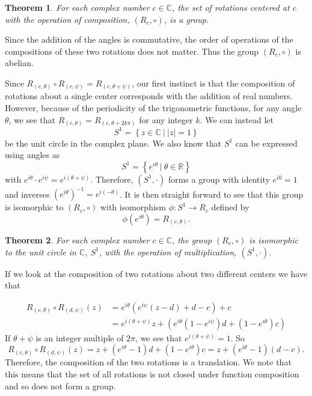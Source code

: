 \documentclass[
]{book}
\newtheorem{theorem}{Theorem}[chapter]
\theoremstyle{definition}
\theoremstyle{definition}
\theoremstyle{definition}
\theoremstyle{definition}
\theoremstyle{remark}
\begin{document}
\begin{theorem}
For each complex number \(c\in \mathbb{C}\), the set of rotations centered at \(c\) with the operation of composition, \((R_c,\circ)\), is a group.
\end{theorem}

Since the addition of the angles is commutative, the order of operations of the compositions of these two rotations does not matter. Thus the group \((R_c,\circ)\) is abelian.

Since \(R_{(c,\theta)} \circ R_{(c,\psi)} = R_{(c, \theta+\psi)}\), our first instinct is that the composition of rotations about a single center corresponds with the addition of real numbers. However, because of the periodicity of the trigonometric functions, for any angle \(\theta\), we see that \(R_{(c,\theta)} = R_{(c,\theta+2k\pi)}\) for any integer \(k\). We can instead let \[S^1= \left\{ z\in \mathbb{C} \: \vert \: |z|=1\right\}\] be the unit circle in the complex plane. We also know that \(S^1\) can be expressed using angles as \[S^1=\left\{ e^{i\theta} \: \vert \: \theta\in \mathbb{R}\right\}\] with \(e^{i\theta} \cdot e^{i\psi} = e^{i (\theta+\psi)}\). Therefore, \((S^1,\cdot)\) forms a group with identity \(e^{i0}=1\) and inverses \(\left(e^{i\theta}\right)^{-1} = e^{i (-\theta)}\). It is then straight forward to see that this group is isomorphic to \((R_c,\circ)\) with isomorphism
\(\phi:S^1\rightarrow R_c\) defined by \[\phi \left(e^{i\theta} \right) = R_{(c,\theta)}.\]

\begin{theorem}
For each complex number \(c\in \mathbb{C}\), the group \((R_c,\circ)\) is isomorphic to the unit circle in \(\mathbb{C}\), \(S^1\), with the operation of multiplication, \((S^1,\cdot)\).
\end{theorem}

If we look at the composition of two rotations about two different centers we have that

\begin{align*}
    R_{(c,\theta)} \circ R_{(d,\psi)}(z) & = e^{i\theta} \left( e^{i\psi}(z-d)+d-c\right) +c \\
    & = e^{i(\theta + \psi)} z + \left( e^{i\theta} \left(1-e^{i\psi}\right) d + (1-e^{i\theta}) c\right)
\end{align*}
If \(\theta+\psi\) is an integer multiple of \(2\pi\), we see that \(e^{i(\theta+\psi)}=1\). So
\[R_{(c,\theta)} \circ R_{(d,\psi)}(z) = z + (e^{i\theta}-1) d + (1-e^{i\theta}) c = z+ (e^{i\theta}-1)(d-c).\] Therefore, the composition of the two rotations is a translation. We note that this means that the set of all rotations is not closed under function composition and so does not form a group.
\end{document}
